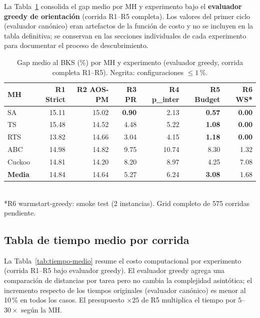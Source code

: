 \documentclass[11pt,a4paper]{article}
\theoremstyle{definition}
\theoremstyle{remark}
\begin{document}
La Tabla~\ref{tab:comparativa-global} consolida el gap medio por MH y
experimento bajo el \textbf{evaluador greedy de orientación} (corrida
R1--R5 completa). Los valores del primer ciclo (evaluador canónico)
eran artefactos de la función de costo y no se incluyen en la tabla
definitiva; se conservan en las secciones individuales de cada
experimento para documentar el proceso de descubrimiento.

\begin{table}[h]
\centering
\caption{Gap medio al BKS (\%) por MH y experimento (evaluador greedy,
         corrida completa R1--R5). Negrita: configuraciones $\leq 1$\,\%.}
\label{tab:comparativa-global}
\small
\begin{tabular}{lrrrrrr}
\toprule
MH & R1 Strict & R2 AOS-PM & R3 PR & R4 p\_inter & R5 Budget & R6 WS* \\
\midrule
SA      & 15.11 & 15.02 & \textbf{0.90} & 2.13 & \textbf{0.57} & \textbf{0.00} \\
TS      & 15.48 & 14.52 & 4.48          & 5.22 & \textbf{1.08} & \textbf{0.00} \\
RTS     & 13.82 & 14.66 & 3.04          & 4.15 & \textbf{1.18} & \textbf{0.00} \\
ABC     & 14.98 & 14.82 & 9.75          & 10.74 & 8.30         & 1.32 \\
Cuckoo  & 14.81 & 14.20 & 8.20          & 8.97  & 4.25         & 7.08 \\
\midrule
\textbf{Media} & 14.84 & 14.64 & 5.27 & 6.24 & \textbf{3.08} & 1.68 \\
\bottomrule
\end{tabular}
\\[4pt]
\footnotesize
*R6 warmstart-greedy: smoke test (2 instancias). Grid completo de 575 corridas pendiente.
\end{table}

\subsection{Tabla de tiempo medio por corrida}

La Tabla~\ref{tab:tiempo-medio} resume el costo computacional por
experimento (corrida R1--R5 bajo evaluador greedy). El evaluador greedy
agrega una comparación de distancias por tarea pero no cambia la
complejidad asintótica; el incremento respecto de los tiempos originales
(evaluador canónico) es menor al 10\,\% en todos los casos. El
presupuesto $\times 25$ de R5 multiplica el tiempo por
$5$--$30\times$ según la MH.
\end{document}
